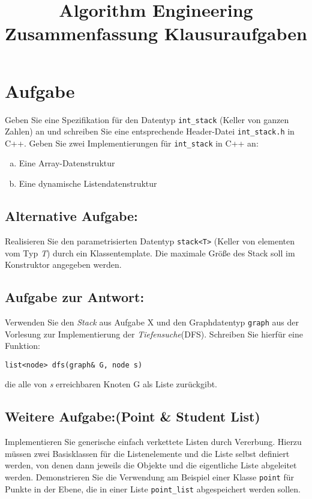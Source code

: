 \documentclass[11pt,a4paper]{scrartcl}
\title{Algorithm Engineering\\\LARGE{Zusammenfassung Klausuraufgaben}}
\begin{document}
\maketitle

\section{Aufgabe}

Geben Sie eine Spezifikation für den Datentyp \texttt{int\_stack} (Keller von ganzen Zahlen) an und schreiben Sie eine entsprechende Header-Datei \texttt{int\_stack.h} in C++. Geben Sie zwei Implementierungen für \texttt{int\_stack} in C++ an:
	

\begin{enumerate}[a)]
	\item Eine Array-Datenstruktur
		
	\item Eine dynamische Listendatenstruktur
		
\end{enumerate}

	\subsection{Alternative Aufgabe:}
	
	Realisieren Sie den parametrisierten Datentyp \texttt{stack<T>} (Keller von elementen vom Typ \textit{T}) durch ein Klassentemplate. Die maximale Größe des Stack soll im Konstruktor angegeben werden.
	
	\subsection{Aufgabe zur Antwort:}
	
	Verwenden Sie den \textit{Stack} aus Aufgabe X und den Graphdatentyp \texttt{graph} aus der Vorlesung zur Implementierung der \textit{Tiefensuche}(DFS). Schreiben Sie hierfür eine Funktion:
	\begin{center}
		\texttt{list<node> dfs(graph\& G, node s)}
	\end{center}
	die alle von \textit{s} erreichbaren Knoten G als Liste zurückgibt.
	
	
	\subsection{Weitere Aufgabe:(Point \& Student List)}
	
	Implementieren Sie generische einfach verkettete Listen durch Vererbung. Hierzu müssen zwei Basisklassen für die Listenelemente und die Liste selbst definiert werden, von denen dann jeweils die Objekte und die eigentliche Liste abgeleitet werden. Demonstrieren Sie die Verwendung am Beispiel einer Klasse \texttt{point} für Punkte in der Ebene, die in einer Liste \texttt{point\_list} abgespeichert werden sollen. 
	\\
	
\end{document}
